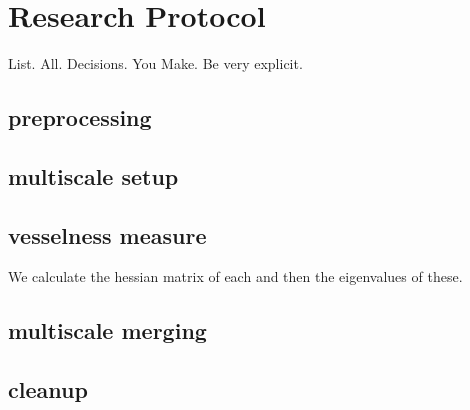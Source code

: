\chapter{Research Protocol}
List. All. Decisions. You Make. Be very explicit.

\section{preprocessing}

\section{multiscale setup}
\section{vesselness measure}
We calculate the hessian matrix of each and then the eigenvalues of these.

\section{multiscale merging}
\section{cleanup}
